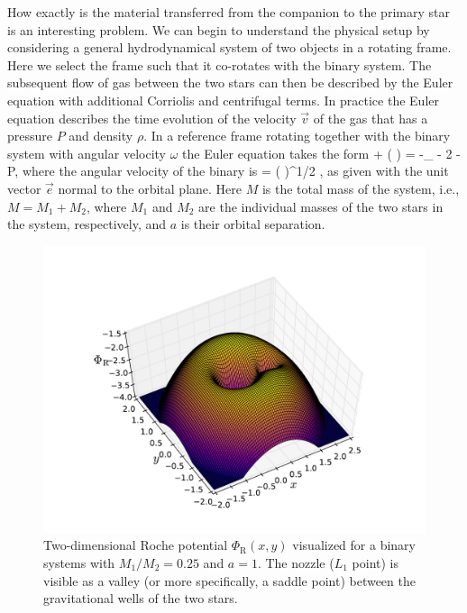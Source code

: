 How exactly is the material transferred from the companion to the primary star is an interesting problem.
We can begin to understand the physical setup by considering a general hydrodynamical system of two objects in a rotating frame.
Here we select the frame such that it co-rotates with the binary system. %
The subsequent flow of gas between the two stars can then be described by the Euler equation with additional Corriolis and centrifugal terms.\cite[see, e.g,][for a good introduction]{Cho98}
In practice the Euler equation describes the time evolution of the velocity $\vec{v}$ of the gas that has a pressure $P$ and density $\rho$.
In a reference frame rotating together with the binary system with angular velocity $\omega$ the Euler equation takes the form 
\be
{} + ( \cdot \nabla) = -\nabla \Phi_{} - 2 \vec{ \omega } \times {} -  \nabla P,
\ee
where the angular velocity of the binary is
\be
\vec{ \omega } = \left(  \right)^{1/2} ,
\ee
as given with the unit vector $\vec{e}$ normal to the orbital plane.
Here $M$ is the total mass of the system, i.e., $M = M_1 + M_2$, where $M_1$ and $M_2$ are the individual masses of the two stars in the system, respectively, and $a$ is their orbital separation.

\begin{figure}[t!]
\includegraphics[width=16cm]{figs/astro/roche.pdf}
\caption{\label{fig:roche}
    Two-dimensional Roche potential $\Phi_{\mathrm{R}}(x,y)$ visualized for a binary systems with $M_1/M_2 = 0.25$ and $a = 1$. 
    The nozzle ($L_1$ point) is visible as a valley (or more specifically, a saddle point) between the gravitational wells of the two stars.
}
\end{figure}

